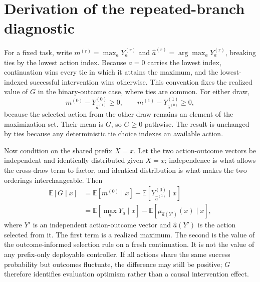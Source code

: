 \clearpage
\appendix
\section{Derivation of the repeated-branch diagnostic}
\label{app:proof}

For a fixed task, write $m^{(r)}=\max_aY_a^{(r)}$ and $\widehat a^{(r)}=\arg\max_aY_a^{(r)}$, breaking ties by the lowest action index. Because $a=0$ carries the lowest index, continuation wins every tie in which it attains the maximum, and the lowest-indexed successful intervention wins otherwise. This convention fixes the realized value of $G$ in the binary-outcome case, where ties are common. For either draw,
\begin{equation}
m^{(0)}-Y_{\widehat a^{(1)}}^{(0)}\geq0,
\qquad
m^{(1)}-Y_{\widehat a^{(0)}}^{(1)}\geq0,
\end{equation}
because the selected action from the other draw remains an element of the maximization set. Their mean is $G$, so $G\geq0$ pathwise. The result is unchanged by ties because any deterministic tie choice indexes an available action.

Now condition on the shared prefix $X=x$. Let the two action-outcome vectors be independent and identically distributed given $X=x$; independence is what allows the cross-draw term to factor, and identical distribution is what makes the two orderings interchangeable. Then
\begin{align}
\mathbb E[G\mid x]
&=\mathbb E[m^{(0)}\mid x]
-\mathbb E[Y_{\widehat a^{(1)}}^{(0)}\mid x] \\
&=\mathbb E\!\left[\max_aY_a\mid x\right]
-\mathbb E\!\left[\mu_{\widehat a(Y')} (x)\mid x\right],
\end{align}
where $Y'$ is an independent action-outcome vector and $\widehat a(Y')$ is the action selected from it. The first term is a realized maximum. The second is the value of the outcome-informed selection rule on a fresh continuation. It is not the value of any prefix-only deployable controller. If all actions share the same success probability but outcomes fluctuate, the difference may still be positive; $G$ therefore identifies evaluation optimism rather than a causal intervention effect.


